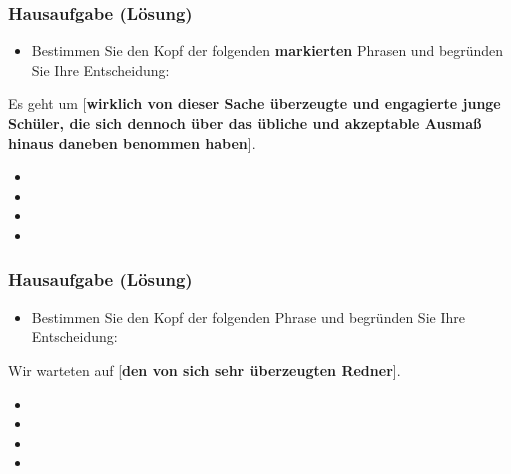 {

\begin{frame}
\frametitle{Hausaufgabe (Lösung)} 

\begin{itemize}
	\item Bestimmen Sie den Kopf der folgenden \textbf{markierten} Phrasen und begründen Sie Ihre Entscheidung:
\end{itemize}
	
	\ea Es geht um [\textbf{wirklich von dieser Sache überzeugte und engagierte junge Schüler, die sich dennoch über das übliche und akzeptable Ausmaß hinaus daneben benommen haben}].
	\z

\pause 

	
\begin{itemize}
	\item {}
	\item {}
	\item {}
	\item {}
\end{itemize}

	
\end{frame}


\begin{frame}
\frametitle{Hausaufgabe (Lösung)} 

\begin{itemize}
	\item Bestimmen Sie den Kopf der folgenden Phrase und begründen Sie Ihre Entscheidung:
\end{itemize}

\ea Wir warteten auf [\textbf{den von sich sehr überzeugten Redner}].
\z 

\pause 

\begin{itemize}
	\item {}
	\item {}
	\item {}
	\item {}
\end{itemize}
	
	
\end{frame}

}


